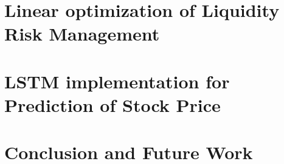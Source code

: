 \documentclass[a4paper,12pt,oneside]{book}
\theoremstyle{plain}
\begin{document}
	\chapter{Linear optimization of Liquidity Risk Management}
	
	
	\chapter{LSTM implementation for Prediction of Stock Price}
	
	
	\chapter{Conclusion and Future Work}
	
	
	\clearpage
	
	
\end{document}
